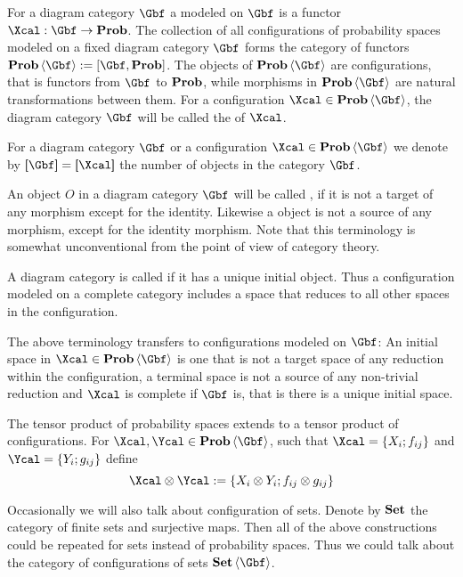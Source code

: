   For a diagram category $\Gbf$ a  modeled on $\Gbf$ is a functor $\Xcal: \Gbf\to \prob$.
  The collection of all configurations of probability spaces modeled
  on a fixed diagram category $\Gbf$ forms the category of functors
  $\prob\<\Gbf>:=[\Gbf,\prob]$. The objects of $\prob\<\Gbf>$ are
  configurations, that is functors from $\Gbf$ to $\operatorname{\mathbf{Prob}}$, while
  morphisms in $\prob\<\Gbf>$ are natural transformations between
  them.  For a configuration $\Xcal\in\prob\<\Gbf>$, the diagram
  category $\Gbf$ will be called the  of $\Xcal$.

  For a diagram category $\Gbf$ or a configuration
  $\Xcal\in\prob\<\Gbf>$ we denote by $\size{\Gbf}=\size{\Xcal}$ the
  number of objects in the category $\Gbf$.

  An object $O$ in a diagram category $\Gbf$ will be called
  , if it is not a target of any
  morphism except for the identity. Likewise a  object is not a source of any morphism,
  except for the identity morphism. Note that this terminology is
  somewhat unconventional from the point of view of category theory.
  
   A diagram category is called  if it has a unique initial object. Thus a
   configuration modeled on a complete category includes a space that
   reduces to all other spaces in the configuration.

  The above terminology transfers to configurations modeled on
  $\Gbf$: An initial space in $\Xcal\in\prob\<\Gbf>$ is one that
  is not a target space of any reduction within the configuration, a
  terminal space is not a source of any non-trivial reduction and
  $\Xcal$ is complete if $\Gbf$ is, that is there is a unique initial
  space.

  The tensor product of probability spaces extends to a tensor product
  of configurations. For $\Xcal,\Ycal\in\prob\<\Gbf>$, such that
  $\Xcal=\set{X_{i};f_{ij}}$ and $\Ycal=\set{Y_{i};g_{ij}}$ define
  \[
    \Xcal\otimes\Ycal
    :=
    \set{X_{i}\otimes Y_{i};f_{ij}\otimes g_{ij}}
  \] 

  Occasionally we will also talk about configuration of sets. Denote by
  $\operatorname{\mathbf{Set}}$ the category of finite sets and surjective maps. Then all of the
  above constructions could be repeated for sets instead of probability
  spaces. Thus we could talk about the category of configurations of sets
  $\Set\<\Gbf>$.


